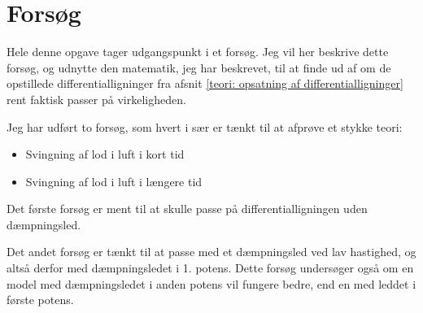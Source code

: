 \chapter{Forsøg}
Hele denne opgave tager udgangspunkt i et forsøg.
Jeg vil her beskrive dette forsøg, og udnytte den matematik, jeg har beskrevet, til at finde ud af om de opstillede differentialligninger fra afsnit \ref{teori: opsatning af differentialligninger} rent faktisk passer på virkeligheden.

Jeg har udført to forsøg, som hvert i sær er tænkt til at afprøve et stykke teori:
\begin{itemize}
	\item Svingning af lod i luft i kort tid
	\item Svingning af lod i luft i længere tid
\end{itemize}

Det første forsøg er ment til at skulle passe på differentialligningen uden dæmpningsled.

Det andet forsøg er tænkt til at passe med et dæmpningsled ved lav hastighed, og altså derfor med dæmpningsledet i 1. potens.
Dette forsøg undersøger også om en model med dæmpningsledet i anden potens vil fungere bedre, end en med leddet i første potens.  
